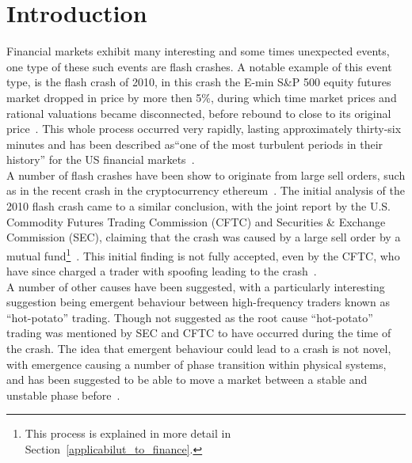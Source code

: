 \documentclass{article}
\begin{document}




\section{Introduction}
Financial markets exhibit many interesting and some times unexpected events, one type of these such events are flash crashes. A notable example of this event type, is the flash crash of 2010, in this crash the E-min S\&P 500 equity futures market dropped in price by more then 5\%, during which time market prices and rational valuations became disconnected, before rebound to close to its original price~\cite{SECreport_delays, rareeventflashcrash}. This whole process occurred very rapidly, lasting approximately thirty-six minutes and has been described as``one of the most turbulent periods in their history'' for the US financial markets~\cite{Impact_hft}.\\
A number of flash crashes have been show to originate from large sell orders, such as in the recent crash in the cryptocurrency ethereum~\cite{cryptocrash}. The initial analysis of the 2010 flash crash came to a similar conclusion, with the  joint report by the U.S. Commodity Futures Trading Commission (CFTC) and Securities \& Exchange Commission (SEC), claiming that the crash was caused by a large sell order by a mutual fund\footnote{This process is explained in more detail in Section~\ref{applicabilut_to_finance}.}~\cite{SECreport_delays}. This initial finding is not fully accepted, even by the CFTC, who have since charged a trader with spoofing leading to the crash~\cite{spoofingtrader}.\\
A number of other causes have been suggested, with a particularly interesting suggestion being emergent behaviour between high-frequency traders known as ``hot-potato'' trading. Though not suggested as the root cause ``hot-potato'' trading was mentioned by SEC and CFTC to have occurred during the time of the crash. The idea that emergent behaviour could lead to a crash is not novel, with emergence causing a number of phase transition within physical systems, and has been suggested to be able to move a market between a stable and unstable phase before~\cite{networkcastphorynature}.\\
\end{document}
